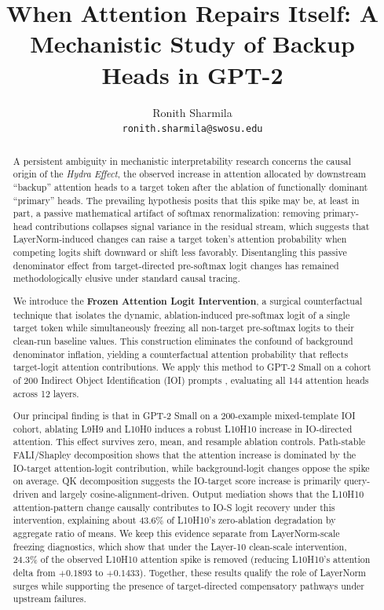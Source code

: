 \documentclass[12pt,a4paper]{article}
\title{%
  \textbf{When Attention Repairs Itself: A Mechanistic Study of Backup Heads in GPT-2}\\
}
\author{
 Ronith Sharmila\\
  \texttt{ronith.sharmila@swosu.edu}
}
\date{} %
\begin{document}
\maketitle
\begin{abstract}

A persistent ambiguity in mechanistic interpretability research concerns the
causal origin of the \emph{Hydra Effect}, the observed increase in attention
allocated by downstream ``backup'' attention heads to a target token after the
ablation of functionally dominant ``primary'' heads. The prevailing hypothesis
posits that this spike may be, at least in part, a passive mathematical artifact
of softmax renormalization: removing primary-head contributions collapses signal
variance in the residual stream, which suggests that LayerNorm-induced changes can
raise a target token's attention probability when competing logits shift downward or
shift less favorably.
Disentangling this passive denominator effect from target-directed pre-softmax logit
changes has remained methodologically elusive under standard causal tracing.

We introduce the \textbf{Frozen Attention Logit Intervention}, a surgical
counterfactual technique that isolates the dynamic, ablation-induced pre-softmax
logit of a single target token while simultaneously freezing all non-target
pre-softmax logits to their clean-run baseline values. This construction
eliminates the confound of background denominator inflation, yielding a
counterfactual attention probability that reflects target-logit attention contributions.
We apply this method to GPT-2 Small \citep{radford2019language} on a cohort of
200 Indirect Object Identification (IOI) prompts \citep{wang2022interpretability},
evaluating all 144 attention heads across 12 layers.

Our principal finding is that in GPT-2 Small on a 200-example mixed-template
IOI cohort, ablating L9H9 and L10H0 induces a robust L10H10 increase in IO-directed
attention. This effect survives zero, mean, and resample ablation controls.
Path-stable FALI/Shapley decomposition shows that the attention increase is
dominated by the IO-target attention-logit contribution, while background-logit
changes oppose the spike on average. QK decomposition suggests the IO-target score
increase is primarily query-driven and largely cosine-alignment-driven.
Output mediation shows that the L10H10 attention-pattern change causally contributes
to IO-S logit recovery under this intervention, explaining about 43.6\% of
L10H10’s zero-ablation degradation by aggregate ratio of means. We keep this
evidence separate from LayerNorm-scale freezing diagnostics, which show that under the
Layer-10 clean-scale intervention, 24.3\% of the observed L10H10 attention spike is removed
(reducing L10H10's attention delta from $+0.1893$ to $+0.1433$). Together, these
results qualify the role of LayerNorm surges while supporting the presence of
target-directed compensatory pathways under upstream failures.
\end{abstract}
\end{document}
